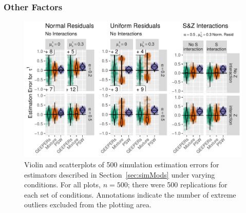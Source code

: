 \documentclass{statsoc} %
\begin{document}
\subsubsection{Other Factors}


\begin{figure}[!ht]
  \centering
  \includegraphics[width=\textwidth,clip]{../simFigs/boxplots.pdf}
  \caption{Violin and scatterplots of 500 simulation estimation errors for estimators described in Section~\ref{sec:simMods} under varying conditions. For all plots, $n=500$; there were 500 replications for each set of conditions. Annotations indicate the number of extreme outliers excluded from the plotting area.}
  \label{fig:boxplots}
\end{figure}
\end{document}
